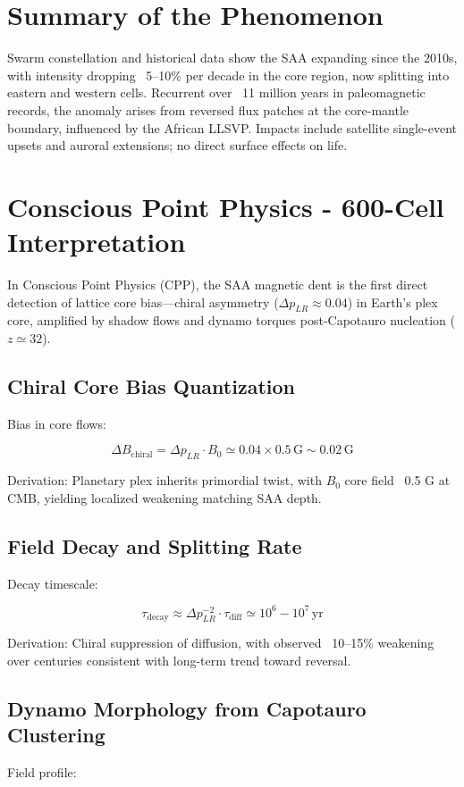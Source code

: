 \documentclass[11pt]{article}
\begin{document}
\section{Summary of the Phenomenon}
Swarm constellation and historical data show the SAA expanding since the 2010s, with intensity dropping ~5--10\% per decade in the core region, now splitting into eastern and western cells. Recurrent over ~11 million years in paleomagnetic records, the anomaly arises from reversed flux patches at the core-mantle boundary, influenced by the African LLSVP. Impacts include satellite single-event upsets and auroral extensions; no direct surface effects on life.

\section{Conscious Point Physics - 600-Cell Interpretation}
In Conscious Point Physics (CPP), the SAA magnetic dent is the first direct detection of lattice core bias—chiral asymmetry ($\Delta p_{LR} \approx 0.04$) in Earth's plex core, amplified by shadow flows and dynamo torques post-Capotauro nucleation ($z \simeq 32$).

\subsection{Chiral Core Bias Quantization}
Bias in core flows:

\[
\Delta B_{\text{chiral}} = \Delta p_{LR} \cdot B_0 \simeq 0.04 \times 0.5 \, \text{G} \sim 0.02 \, \text{G}
\]

Derivation: Planetary plex inherits primordial twist, with $B_0$ core field ~0.5 G at CMB, yielding localized weakening matching SAA depth.

\subsection{Field Decay and Splitting Rate}
Decay timescale:

\[
\tau_{\text{decay}} \approx \Delta p_{LR}^{-2} \cdot \tau_{\text{diff}} \simeq 10^{6} - 10^{7} \, \text{yr}
\]

Derivation: Chiral suppression of diffusion, with observed ~10--15\% weakening over centuries consistent with long-term trend toward reversal.

\subsection{Dynamo Morphology from Capotauro Clustering}
Field profile:
\end{document}
